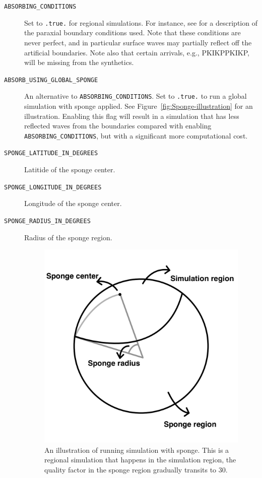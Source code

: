 \begin{description}
\item [{\texttt{ABSORBING\_CONDITIONS}}] Set to \texttt{.true.}{\small{}
}for regional simulations. For instance, see \citet{KoTr99} for a
description of the paraxial boundary conditions used. Note that these
conditions are never perfect, and in particular surface waves may
partially reflect off the artificial boundaries. Note also that certain
arrivals, e.g., PKIKPPKIKP, will be missing from the synthetics.
\item [{\texttt{ABSORB\_USING\_GLOBAL\_SPONGE}}] An alternative to {\texttt{ABSORBING\_CONDITIONS}}. Set to \texttt{.true.} to run a global simulation with sponge applied. See Figure~\vref{fig:Sponge-illustration}
for an illustration. Enabling this flag will result in a simulation that has less reflected waves from the boundaries compared with enabling {\texttt{ABSORBING\_CONDITIONS}}, but with a significant more computational cost.
\item [{\texttt{SPONGE\_LATITUDE\_IN\_DEGREES}}] Latitide of the sponge center.
\item [{\texttt{SPONGE\_LONGITUDE\_IN\_DEGREES}}] Longitude of the sponge center.
\item [{\texttt{SPONGE\_RADIUS\_IN\_DEGREES}}] Radius of the sponge region.

%
\begin{figure}[H]
\begin{centering}
\includegraphics[scale=0.2]{figures/fig6.jpg}
\par\end{centering}

\caption{An illustration of running simulation with sponge.
This is a regional simulation that happens in the simulation region, the quality factor in the sponge region gradually transits to 30.}
\label{fig:Sponge-illustration}
\end{figure}

\end{description}
